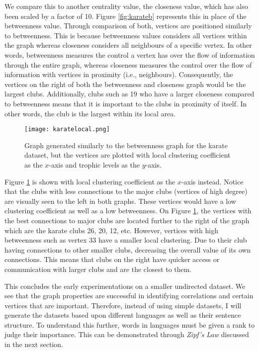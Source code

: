 We compare this to another centrality value, the closeness value, which has also been scaled by a factor of 10. Figure \ref{fig:karateb} represents this in place of the betweenness value. Through comparison of both, vertices are positioned similarly to betweenness. This is because betweenness values considers all vertices within the graph whereas closeness considers all neighbours of a specific vertex. In other words, betweenness measures the control a vertex has over the flow of information through the entire graph, whereas closeness measures the control over the flow of information with vertices in proximity (i.e., neighbours). Consequently, the vertices on the right of both the betweenness and closeness graph would be the largest clubs. Additionally, clubs such as 19 who have a larger closeness compared to betweenness means that it is important to the clubs in proximity of itself. In other words, the club is the largest within its local area.

\begin{figure}[!htb]
	\centering
	\texttt{[image: karatelocal.png]}
	\caption{Graph generated similarly to the betweenness graph for the karate dataset, but the vertices are plotted with local clustering coefficient as the $x$-axis and trophic levels as the $y$-axis.}
	\label{fig:karatelocal}
\end{figure}

Figure \ref{fig:karatelocal} is shown with local clustering coefficient as the $x$-axis instead. Notice that the clubs with less connections to the major clubs (vertices of high degree) are visually seen to the left in both graphs. These vertices would have a low clustering coefficient as well as a low betweenness. On Figure \ref{fig:karatelocal}, the vertices with the best connections to major clubs are located further to the right of the graph which are the karate clubs 26, 20, 12, etc. However, vertices with high betweenness such as vertex 33 have a smaller local clustering. Due to their club having connections to other smaller clubs, decreasing the overall value of its own connections. This means that clubs on the right have quicker access or communication with larger clubs and are the closest to them.

This concludes the early experimentations on a smaller undirected dataset. We see that the graph properties are successful in identifying correlations and certain vertices that are important. Therefore, instead of using simple datasets, I will generate the datasets based upon different languages as well as their sentence structure. To understand this further, words in languages must be given a rank to judge their importance. This can be demonstrated through \emph{Zipf's Law} discussed in the next section.

